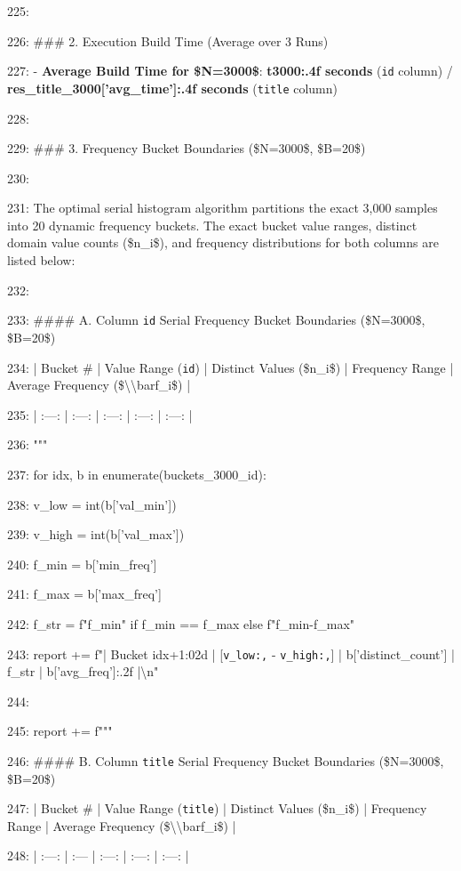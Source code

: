 \documentclass[11pt,a4paper]{article}
\begin{document}
225:

226: \#\#\# 2. Execution Build Time (Average over 3 Runs)

227: - \textbf{Average Build Time for \$N=3000\$}: \textbf{{t3000:.4f} seconds} (\texttt{id} column) / \textbf{{res\_title\_3000['avg\_time']:.4f} seconds} (\texttt{title} column)

228:

229: \#\#\# 3. Frequency Bucket Boundaries (\$N=3000\$, \$B=20\$)

230:

231: The optimal serial histogram algorithm partitions the exact 3,000 samples into 20 dynamic frequency buckets. The exact bucket value ranges, distinct domain value counts (\$n\_i\$), and frequency distributions for both columns are listed below:

232:

233: \#\#\#\# A. Column \texttt{id} Serial Frequency Bucket Boundaries (\$N=3000\$, \$B=20\$)

234: | Bucket \# | Value Range (\texttt{id}) | Distinct Values (\$n\_i\$) | Frequency Range | Average Frequency (\$\textbackslash{}\textbackslash{}bar{{f}}\_i\$) |

235: | :---: | :---: | :---: | :---: | :---: |

236: """

237:     for idx, b in enumerate(buckets\_3000\_id):

238:         v\_low = int(b['val\_min'])

239:         v\_high = int(b['val\_max'])

240:         f\_min = b['min\_freq']

241:         f\_max = b['max\_freq']

242:         f\_str = f"{f\_min}" if f\_min == f\_max else f"{f\_min}-{f\_max}"

243:         report += f"| Bucket {idx+1:02d} | [\texttt{{v\_low:,}} - \texttt{{v\_high:,}}] | {b['distinct\_count']} | {f\_str} | {b['avg\_freq']:.2f} |\textbackslash{}n"

244:

245:     report += f"""

246: \#\#\#\# B. Column \texttt{title} Serial Frequency Bucket Boundaries (\$N=3000\$, \$B=20\$)

247: | Bucket \# | Value Range (\texttt{title}) | Distinct Values (\$n\_i\$) | Frequency Range | Average Frequency (\$\textbackslash{}\textbackslash{}bar{{f}}\_i\$) |

248: | :---: | :--- | :---: | :---: | :---: |
\end{document}
